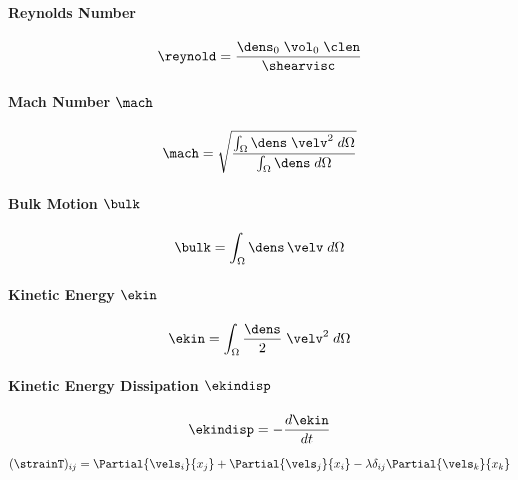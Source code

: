 \paragraph{Reynolds Number}

\begin{equation}
\label{eq:reynold}
    \reynold = \frac{\dens_0\;\vol_0\;\clen}{\shearvisc}
\end{equation}

\paragraph{Mach Number $\mach$}

\begin{equation}
\label{eq:mach}
    \mach = \sqrt{\frac{\int_\Omega \dens \; \velv^2 \; d\Omega}{\int_\Omega \dens \; d\Omega}}
\end{equation}

\paragraph{Bulk Motion $\bulk$}

\begin{equation}
\label{eq:bulk-motion}
    \bulk = \int_{\Omega} \dens\,\velv \; d\Omega
\end{equation}

\paragraph{Kinetic Energy $\ekin$}

\begin{equation}
\label{eq:ekin}
    \ekin = \int_\Omega \frac{\dens}{2} \; \velv^2 \; d\Omega
\end{equation}

\paragraph{Kinetic Energy Dissipation $\ekindisp$}

\begin{equation}
\label{eq:ekindisp}
    \ekindisp = -\frac{d\ekin}{dt} 
\end{equation}

\begin{equation}
\label{eq:straintensor}
    (\strainT)_{ij} = \Partial{\vels_i}{x_j} + \Partial{\vels_j}{x_i} - \lambda \delta_{ij} \Partial{\vels_k}{x_k}
\end{equation}

